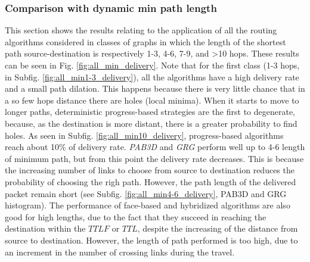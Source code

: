 \documentclass[journal,comsoc]{IEEEtran}
\begin{document}
\subsubsection{Comparison with dynamic min path length}
This section shows the results relating to the application of all the routing algorithms considered in classes of graphs in which the length of the shortest path source-destination is respectively 1-3, 4-6, 7-9, and >10 hops. These results can be seen in Fig. \ref{fig:all_min_delivery}. Note that for the first class (1-3 hops, in Subfig. \ref{fig:all_min1-3_delivery}), all the algorithms have a high delivery rate and a small path dilation. This happens because there is very little chance that in a so few hops distance there are holes (local minima).
When it starts to move to longer paths, deterministic progress-based strategies are the first to degenerate, because, as the destination is more distant, there is a greater probability to find holes. As seen in Subfig. \ref{fig:all_min10_delivery}, progress-based algorithms reach about 10\% of delivery rate.
\emph{PAB3D} and \emph{GRG} perform well up to 4-6 length of minimum path, but from this point the delivery rate decreases. This is because the increasing number of links to choose from source to destination reduces the probability of choosing the righ path. However, the path length of the delivered packet remain short (see Subfig. \ref{fig:all_min4-6_delivery}, PAB3D and GRG histogram). The performance of face-based and hybridized algorithms are also good for high lengths, due to the fact that they succeed in reaching the destination within the \(TTLF\) or \(TTL\), despite the increasing of the distance from source to destination. However, the length of path performed is too high, due to an increment in the number of crossing links during the travel. \cite{IEEEhowto:kopka}
\end{document}
